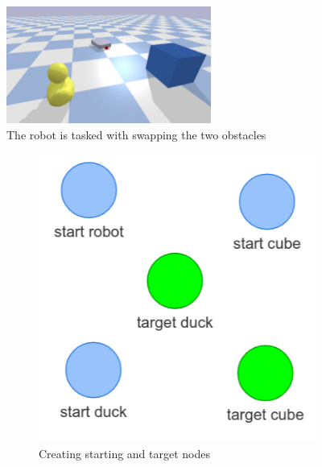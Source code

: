 \begin{figure}[H]
    \centering
    \includegraphics[width=0.6\textwidth]{figures/swap/swap_obstacles.png}
    \caption{The robot is tasked with swapping the two obstacles}
    \label{figure: swap_obstacles}
\end{figure}

\begin{figure}[H]
     \centering
     \begin{subfigure}[b]{0.49\textwidth}
         \centering
         \includegraphics[width=\textwidth]{figures/swap/1.png}
         \caption{Creating starting and target nodes}
     \end{subfigure}
     \hfill
     \begin{subfigure}[b]{0.49\textwidth}
         \centering

\end{subfigure}
\end{figure}

